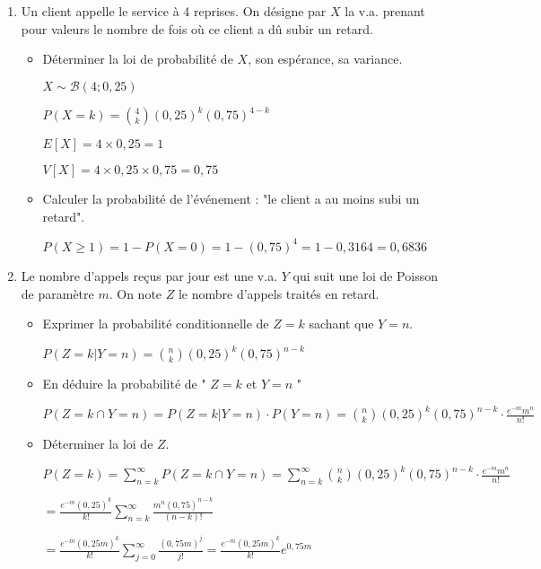 \begin{enumerate}
    \item Un client appelle le service à 4 reprises. On désigne par \(X\) la v.a. prenant pour valeurs le nombre de fois où ce client a dû subir un retard.
    \begin{itemize}
        \item Déterminer la loi de probabilité de \(X\), son espérance, sa variance.
        
        \(X \sim \mathcal{B}(4; 0,25)\)
        
        \(P(X=k) = \binom{4}{k} (0,25)^k (0,75)^{4-k}\)
        
        \(E[X] = 4 \times 0,25 = 1\)
        
        \(V[X] = 4 \times 0,25 \times 0,75 = 0,75\)
        
        \item Calculer la probabilité de l'événement : "le client a au moins subi un retard".
        
        \(P(X \geq 1) = 1 - P(X=0) = 1 - (0,75)^4 = 1 - 0,3164 = 0,6836\)
    \end{itemize}
    
    \item Le nombre d'appels reçus par jour est une v.a. \(Y\) qui suit une loi de Poisson de paramètre \(m\). On note \(Z\) le nombre d'appels traités en retard.
    \begin{itemize}
        \item Exprimer la probabilité conditionnelle de \(Z=k\) sachant que \(Y=n\).
        
        \(P(Z=k | Y=n) = \binom{n}{k} (0,25)^k (0,75)^{n-k}\)
        
        \item En déduire la probabilité de " \(Z=k\) et \(Y=n\) "
        
        \(P(Z=k \cap Y=n) = P(Z=k | Y=n) \cdot P(Y=n) = \binom{n}{k} (0,25)^k (0,75)^{n-k} \cdot \frac{e^{-m} m^n}{n!}\)
        
        \item Déterminer la loi de \(Z\).
        
        \(P(Z=k) = \sum_{n=k}^{\infty} P(Z=k \cap Y=n) = \sum_{n=k}^{\infty} \binom{n}{k} (0,25)^k (0,75)^{n-k} \cdot \frac{e^{-m} m^n}{n!}\)
        
        \(= \frac{e^{-m} (0,25)^k}{k!} \sum_{n=k}^{\infty} \frac{m^n (0,75)^{n-k}}{(n-k)!}\)
        
        \(= \frac{e^{-m} (0,25 m)^k}{k!} \sum_{j=0}^{\infty} \frac{(0,75 m)^j}{j!} = \frac{e^{-m} (0,25 m)^k}{k!} e^{0,75 m}\)
        

\end{itemize}
\end{enumerate}
